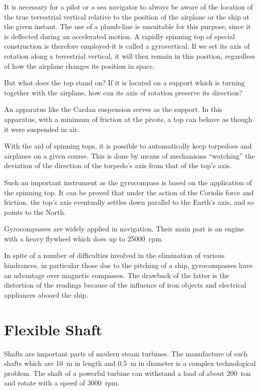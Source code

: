 It is necessary for a pilot or a sea navigator to always
be aware of the location of the true terrestrial vertical
relative to the position of the airplane or the ship at the
given instant. The use of a plumb-line is unsuitable for
this purpose, since it is deflected during an accelerated
motion. A rapidly spinning top of special construction
is therefore employed-it is called a gyrovertical. If we
set its axis of rotation along a terrestrial vertical, it will
then remain in this position, regardless of how the airplane changes its position in space.

But what does the top stand on? If it is located on a
support which is turning together with the airplane, how
can its axis of rotation preserve its direction?

An apparatus like the Cardan suspension 
serves as the support. In this apparatus, with a minimum
of friction at the pivots, a top can behave as though it
were suspended in air.

With the aid of spinning tops, it is possible to automatically keep torpedoes and airplanes on a given course.
This is done by means of mechanisms ``watching'' the
deviation of the direction of the torpedo's axis from that
of the top's axis.

Such an important instrument as the gyrocompass is
based on the application of the spinning top. It can be
proved that under the action of the Coriolis force and
friction, the top's axis eventually settles down parallel
to the Earth's axis, and so points to the North.

Gyrocompasses are widely applied in navigation. Their
main part is an engine with a heavy flywheel which does
up to \num{25000}~rpm.

In spite of a number of difficulties involved in the elimination of various hindrances, in particular those due
to the pitching of a ship, gyrocompasses have an advantage over magnetic compasses. The drawback of the latter
is the distortion of the readings because of the influence
of iron objects and electrical appliances aboard the ship.

\section{Flexible Shaft}

Shafts are important parts of modern steam turbines. The manufacture of such shafts which are \SI{10}{\meter} in length and \SI{0.5}{\meter} in diameter is a complex technological problem. The shaft of a powerful turbine can withstand a load of about 200~ton and rotate with a speed of 3000~rpm.

